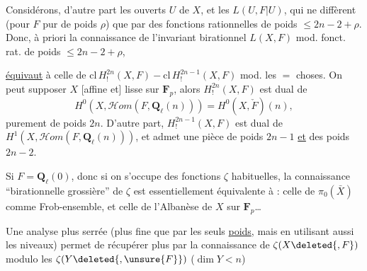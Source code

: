 
Considérons, d'autre part 
les ouverts  $U$ de $X$,  et les
$L(U,F\vert U)$, qui ne diffèrent  (pour $F$ pur
de poids $\rho$) que par des fonctions rationnelles
de poids $\le2n-2+\rho$. Donc, à priori la
connaissance de l'invariant birationnel
$L(X,F)$ mod. fonct. rat. de poids $\le2n-2+\rho$,

\uline{équivaut} à celle de
$\mathrm{cl}\,H^{2n}_!(X,F)-\mathrm{cl}\,H^{2n-1}_!(X,F)$
mod. les $=$ choses. On peut supposer $X$
[affine et] lisse sur $\mathbf F_p$,  alors $H^{2n}_!(X,F)$
est dual de
\[
H^0(X,\mathcal Hom(F,\mathbf Q_\ell(n)))=H^0(X,\check F)(n),
\]
 purement de poids $2n$. D'autre part, $H^{2n-1}_!(X,F)$
est dual de $H^1(X,\mathcal Hom(F,\mathbf Q_\ell(n)))$, et admet
une pièce de poids $2n-1$ \uline{et} des poids $2n-2$.

Si $F=\mathbf Q_\ell(0)$,  donc
 si on s'occupe des fonctions $\zeta$
habituelles, la connaissance ``birationnelle
grossière'' de $\zeta$ est essentiellement équivalente à :
celle de $\pi_0(\bar X)$ comme Frob-ensemble,
et celle de l'Albanèse de $X$ sur $\mathbf F_p$\ldots
{}

Une analyse plus serrée  (plus
fine que par les seuls \uline{poids}, mais en
utilisant aussi les niveaux) permet de
récupérer plus par la connaissance de
$\zeta(X\deleted{,F})$  modulo les
$\zeta(Y\deleted{,\unsure{F}})$ ($\dim Y<n$)

